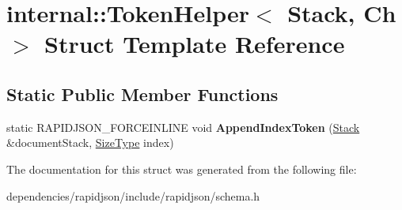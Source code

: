 \hypertarget{structinternal_1_1_token_helper}{}\section{internal\+:\+:Token\+Helper$<$ Stack, Ch $>$ Struct Template Reference}
\label{structinternal_1_1_token_helper}
\subsection*{Static Public Member Functions}
\begin{DoxyCompactItemize}
\item 
\mbox{\label{structinternal_1_1_token_helper_a7b1864bfe6d4014ba7a5114acb26b3ae}} 
static R\+A\+P\+I\+D\+J\+S\+O\+N\+\_\+\+F\+O\+R\+C\+E\+I\+N\+L\+I\+NE void {\bfseries Append\+Index\+Token} (\hyperlink{classinternal_1_1_stack}{Stack} \&document\+Stack, \hyperlink{rapidjson_8h_a5ed6e6e67250fadbd041127e6386dcb5}{Size\+Type} index)
\end{DoxyCompactItemize}


The documentation for this struct was generated from the following file\+:\begin{DoxyCompactItemize}
\item 
dependencies/rapidjson/include/rapidjson/schema.\+h\end{DoxyCompactItemize}
